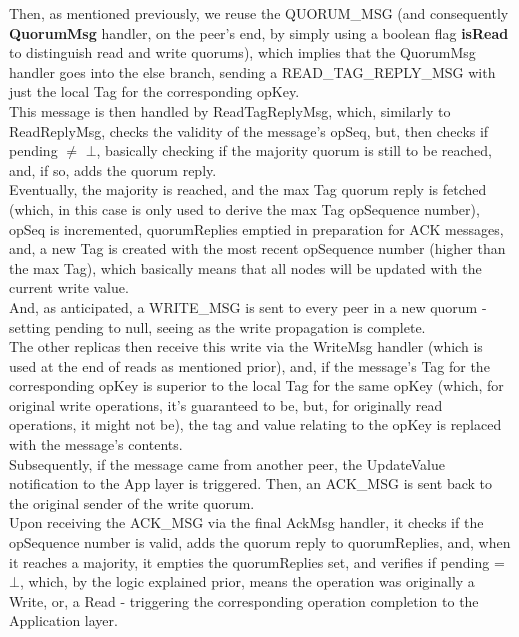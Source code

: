 \documentclass[sigconf]{acmart}
\begin{document}
Then, as mentioned previously, we reuse the QUORUM\_MSG (and consequently \textbf{QuorumMsg} handler, on the peer's end, by simply using a boolean flag \textbf{isRead} to distinguish read and write quorums), which implies that the QuorumMsg handler goes into the else branch, sending a READ\_TAG\_REPLY\_MSG with just the local Tag for the corresponding opKey. \\

This message is then handled by ReadTagReplyMsg, which, similarly to ReadReplyMsg, checks the validity of the message's opSeq, but, then checks if pending $\neq$ $\bot$, basically checking if the majority quorum is still to be reached, and, if so, adds the quorum reply. \\
Eventually, the majority is reached, and the max Tag quorum reply is fetched (which, in this case is only used to derive the max Tag opSequence number), opSeq is incremented, quorumReplies emptied in preparation for ACK messages, and, a new Tag is created with the most recent opSequence number (higher than the max Tag), which basically means that all nodes will be updated with the current write value. \\ And, as anticipated, a WRITE\_MSG is sent to every peer in a new quorum - setting pending to null, seeing as the write propagation is complete. \\

The other replicas then receive this write via the WriteMsg handler (which is used at the end of reads as mentioned prior), and, if the message's Tag for the corresponding opKey is superior to the local Tag for the same opKey (which, for original write operations, it's guaranteed to be, but, for originally read operations, it might not be), the tag and value relating to the opKey is replaced with the message's contents. \\
Subsequently, if the message came from another peer, the UpdateValue notification to the App layer is triggered. Then, an ACK\_MSG is sent back to the original sender of the write quorum. \\

Upon receiving the ACK\_MSG via the final AckMsg handler, it checks if the opSequence number is valid, adds the quorum reply to quorumReplies, and, when it reaches a majority, it empties the quorumReplies set, and verifies if pending = $\bot$, which, by the logic explained prior, means the operation was originally a Write, or, a Read - triggering the corresponding operation completion to the Application layer. \\
\end{document}
